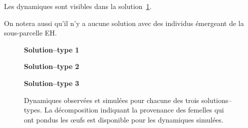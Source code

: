 Les dynamiques sont visibles dans la solution~\ref{fig:C2}.

On notera aussi qu'il n'y a aucune solution avec des individus émergeant de la sous-parcelle EH.


\begin{figure}[ht]
 \centering
 \textbf{Solution--type 1}
 
 
 \textbf{Solution--type 2}
 
 
 \textbf{Solution--type 3}
 
 \caption{Dynamiques observées et simulées pour chacune des trois solutions--types. La décomposition indiquant la provenance des femelles qui ont pondus les œufs est disponible pour les dynamiques simulées.}
 \label{fig:C2}
\end{figure}
